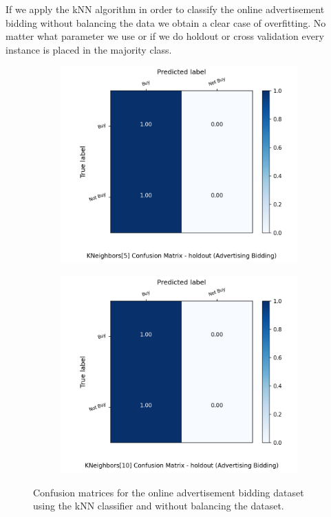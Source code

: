 \documentclass{article}
\begin{document}
If we apply the kNN algorithm in order to classify the online advertisement bidding without balancing the data we obtain a clear case of overfitting.
No matter what parameter we use or if we do holdout or cross validation every instance is placed in the majority class.


\begin{figure}[H]
	\centering
	\begin{subfigure}{.5\textwidth}
		\centering
		\includegraphics[width=1.1\textwidth]{Plots/conv_KNeighbors_5_balance_False_holdout.png}
	\end{subfigure}%
	\begin{subfigure}{.5\textwidth}
		\centering
		\includegraphics[width=1.1\textwidth]{Plots/conv_KNeighbors_10_balance_False_holdout.png}
	\end{subfigure}
	\caption{Confusion matrices for the online advertisement bidding dataset using the kNN classifier and without balancing the dataset.}
\end{figure}
\end{document}

